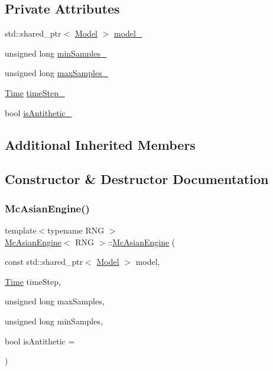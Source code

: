 \subsection*{Private Attributes}
\begin{DoxyCompactItemize}
\item 
std\+::shared\+\_\+ptr$<$ \hyperlink{class_model}{Model} $>$ \hyperlink{class_mc_asian_engine_ae23208fbc0b859e7bfc13821a709c852}{model\+\_\+}
\item 
unsigned long \hyperlink{class_mc_asian_engine_a71e8848ac19c88cee59590b9cab10700}{min\+Samples\+\_\+}
\item 
unsigned long \hyperlink{class_mc_asian_engine_a512cbb76b5daeb503dc55c2ef72dd74f}{max\+Samples\+\_\+}
\item 
\hyperlink{_name_def_8h_ac2d3e0ba793497bcca555c7c2cf64ff3}{Time} \hyperlink{class_mc_asian_engine_a0dadab191a7097d0e474ebf084f6bca8}{time\+Step\+\_\+}
\item 
bool \hyperlink{class_mc_asian_engine_ae5678e3c643e058d4c5f2d6b0e5fe515}{is\+Antithetic\+\_\+}
\end{DoxyCompactItemize}
\subsection*{Additional Inherited Members}


\subsection{Constructor \& Destructor Documentation}
\hypertarget{class_mc_asian_engine_a4b2cd236024fd32623e1f7a7a27277d6}{}\label{class_mc_asian_engine_a4b2cd236024fd32623e1f7a7a27277d6} 
\subsubsection{\texorpdfstring{Mc\+Asian\+Engine()}{McAsianEngine()}}
{\footnotesize\ttfamily template$<$typename R\+NG $>$ \\
\hyperlink{class_mc_asian_engine}{Mc\+Asian\+Engine}$<$ R\+NG $>$\+::\hyperlink{class_mc_asian_engine}{Mc\+Asian\+Engine} (\begin{DoxyParamCaption}\item[{const std\+::shared\+\_\+ptr$<$ \hyperlink{class_model}{Model} $>$}]{model,  }\item[{\hyperlink{_name_def_8h_ac2d3e0ba793497bcca555c7c2cf64ff3}{Time}}]{time\+Step,  }\item[{unsigned long}]{max\+Samples,  }\item[{unsigned long}]{min\+Samples,  }\item[{bool}]{is\+Antithetic = {} }\end{DoxyParamCaption})}



